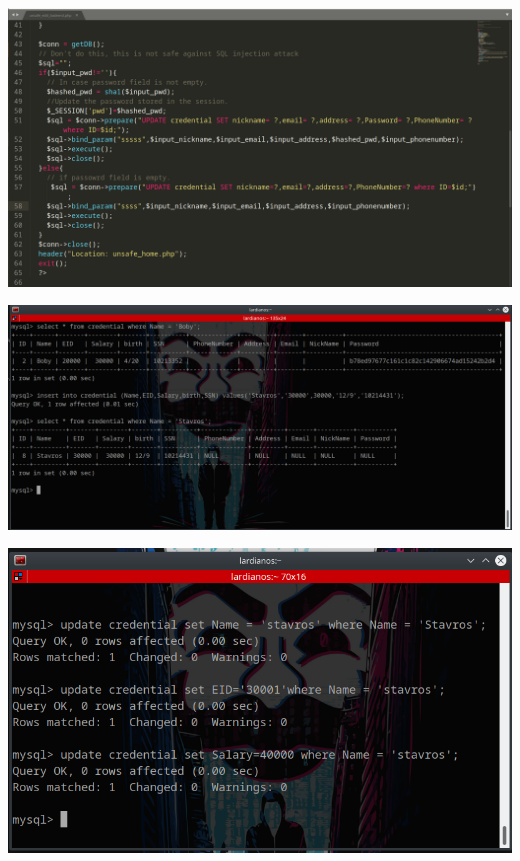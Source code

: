 \begin{center}
			\includegraphics[width=1\textwidth]{image/4.3.PNG}		
\end{center}

\begin{center}
			\includegraphics[width=1\textwidth]{image/3.PNG}		
\end{center}

\begin{center}
			\includegraphics[width=1\textwidth]{image/4.PNG}		
\end{center}


